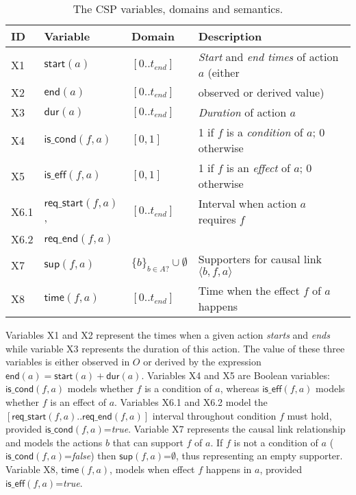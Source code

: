 \documentclass{ecai}
\newcommand{\tup}[1]{{\langle #1 \rangle}}
\newcommand{\dur}{\mathsf{dur}}    %
\newcommand{\iscond}{\mathsf{is\_cond}}    %
\newcommand{\iseff}{\mathsf{is\_eff}}    %
\newcommand{\start}{\mathsf{start}}%
\newcommand{\en}{\mathsf{end}}     %
\newcommand{\supp}{\mathsf{sup}}   %
\newcommand{\tim}{\mathsf{time}}   %
\newcommand{\reqs}{\mathsf{req\_{start}}} %
\newcommand{\reqe}{\mathsf{req\_{end}}}   %
\begin{document}
\begin{table}
\begin{center}
\caption{The CSP variables, domains and semantics.}
\begin{scriptsize}
\begin{tabular}{llll}
\hline	
{\bf ID} & {\bf Variable} & {\bf Domain} & {\bf Description} \\
\hline
X1 &$\start(a)$ & $[0..t_{end}]$ & {\em Start} and {\em end times} of action $a$ (either  \\
X2 &$\en(a)$ & $[0..t_{end}]$ & observed or derived value) \\
X3 &$\dur(a)$ & $[0..t_{end}]$ & {\em Duration} of action $a$ \\

X4 &$\iscond(f,a)$ & $[0,1]$ & 1 if $f$ is a {\em condition} of $a$; 0 otherwise \\
X5 &$\iseff(f,a)$ & $[0,1]$ & 1 if $f$ is an {\em effect} of $a$; 0 otherwise \\

X6.1 &$\reqs(f,a)$, & $[0..t_{end}]$ & Interval when action $a$ requires $f$\\ 
X6.2 &$\reqe(f,a)$  &  & \\

X7 &$\supp(f,a)$ & $\{b\}_{b\in A?} \cup \emptyset $&  Supporters for causal link $\tup{b,f,a}$ \\ 
X8 &$\tim(f,a)$ & $[0..t_{end}]$ & Time when the effect $f$ of $a$ happens\\

\end{tabular}
\end{scriptsize}
\label{table:variables}
\end{center}
\end{table}

Variables X1 and X2 represent the times when a given action {\em starts} and {\em ends} while variable X3 represents the duration of this action. The value of these three variables is either observed in $O$ or derived by the expression $\en(a)=\start(a)+\dur(a)$. Variables X4 and X5 are Boolean variables: $\iscond(f,a)$ models whether $f$ is a condition of $a$, whereas $\iseff(f,a)$ models whether $f$ is an effect of $a$. Variables X6.1 and X6.2 model the $[\reqs(f,a)..\reqe(f,a)]$ interval throughout condition $f$ must hold, provided $\iscond(f,a)$=\textit{true}. Variable X7 represents the causal link relationship and models the actions $b$ that can support $f$ of $a$. If $f$ is not a condition of $a$ ($\iscond(f,a)$=\textit{false}) then $\supp(f,a)$=$\emptyset$, thus representing an empty supporter. Variable X8, $\tim(f,a)$, models when effect $f$ happens in $a$, provided $\iseff(f,a)$=\textit{true}.
\end{document}
